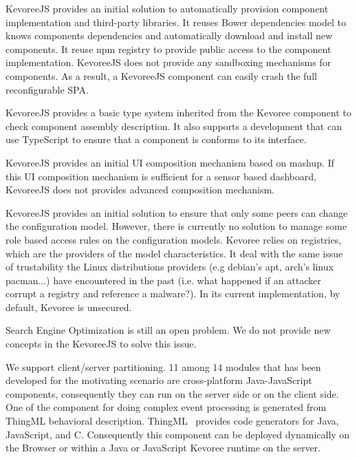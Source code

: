 \begin{description}
	

\item KevoreeJS provides an initial solution to automatically provision component implementation and third-party libraries. It reuses Bower dependencies model to knows components dependencies and automatically download and install new components. It reuse npm registry to provide public access to the component implementation. KevoreeJS does not provide any sandboxing mechanisms for components. As a result, a KevoreeJS component can easily crash the full reconfigurable SPA. 

\item KevoreeJS provides a basic type system inherited from the Kevoree component to check component assembly description. It also supports a development that can use TypeScript to ensure that a component is conforms to its interface.  

\item KevoreeJS provides an initial UI composition mechanism based on mashup. If this UI composition mechanism is sufficient for a sensor based dashboard, KevoreeJS does not provides advanced composition mechanism.  

\item KevoreeJS provides an initial solution to ensure that only some peers can change the configuration model. However, there is currently no solution to manage some role based access rules on the configuration models. Kevoree relies on registries, which are the providers of the model characteristics. It deal with the same issue of trustability the Linux distributions providers (e.g debian's apt, arch's linux pacman...) have encountered in the past (i.e. what happened if an attacker corrupt a registry and reference a malware?).  In its current implementation, by default, Kevoree is unsecured.   

\item Search Engine Optimization is still an open problem. We do not provide new concepts in the KevoreeJS to solve this issue.    

\item We support client/server partitioning. 11 among 14 modules that has been developed for the motivating scenario are cross-platform Java-JavaScript components, consequently they can run on the server side or on the client side.  One of the component for doing complex event processing is generated from ThingML behavioral description. ThingML~\cite{DBLP:conf/models/FleureyMSB11} provides code generators for Java, JavaScript, and C. Consequently this component can be deployed dynamically on the Browser or within a Java or JavaScript Kevoree runtime on the server.  


\end{description}
